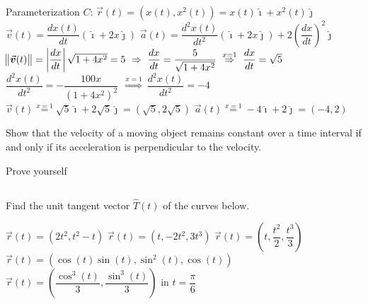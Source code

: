 \begin{Answer}
   
        \Question Parameterization $C$: $\vec r(t)  = \left( x(t), x^2(t) \right) = x(t)  \hat{\imath} + x^2(t) \hat{\jmath} $ 
        \Question $\vec v (t) = \dfrac{d x (t)}{dt} \left( \hat{\imath} + 2x \hat{\jmath} \right)$
        \Question $\vec a (t) = \dfrac{d^2 x(t)}{dt^2} \left( \hat{\imath} + 2x \hat{\jmath}\right) + 2 \left( \dfrac{dx}{dt}\right)^2 \hat{\jmath} $
        \Question $\norm{\vec v (t)} = \left\vert \dfrac{dx}{dt} \right\vert \sqrt{1+4x^2}  = 5 \  \Rightarrow \  \dfrac{dx}{dt} = \dfrac{5}{\sqrt{1+4x^2}}\  \stackrel{x=1}{\Rightarrow} \  \dfrac{dx}{dt}  = \sqrt{5} $
        \Question  $\dfrac{d^2 x(t)}{dt^2} = - \dfrac{100 x}{(1+4x^2)^2}\ \  \stackrel{x=1}{\Rightarrow} \  \dfrac{d^2 x(t)}{dt^2} = -4 $
        \Question $\vec v (t)\stackrel{x=1}{=} \sqrt{5} \hat{\imath}+ 2 \sqrt{5} \hat{\jmath} = \left( \sqrt{5}, 2 \sqrt{5}\right)$
         \Question $\vec a (t)\stackrel{x=1}{=} -4 \hat{\imath}+ 2 \hat{\jmath}= \left( -4, 2\right)$

\end{Answer}


\ifanalysis
\begin{Exercise}[difficulty = 3] Show that the velocity of a moving object remains constant over a time interval if and only if its acceleration is perpendicular to the velocity.  

\end{Exercise}

\begin{Answer}
    Prove yourself
\end{Answer}

\fi
  

\ifcalculus\pagebreak\fi
\subsection*{}     
\begin{Exercise} Find the unit tangent vector $\widehat T(t)$ of the curves below.
     \begin{multicols}{2}
         \Question[difficulty=1] $\vec r(t) = \left(2t^2, t^2-t \right) $ 
         \Question[difficulty=1] $\vec r(t) = \left(t, -2t^2, 3t^3 \right)$ 
         \Question[difficulty=1] $\vec r(t) = \left(t, \dfrac{t^2}{2}, \dfrac{t^3}{3} \right)$ 
         \Question[difficulty=2] $\vec r(t) = \left(\cos(t) \sin (t), \sin^2 (t), \cos(t)\right)$
         \ifanalysis\Question[difficulty=2]\fi\ifcalculus\Question[difficulty=3]\fi  $\vec r(t) = \left(\dfrac{\cos^3(t)}{3}, \dfrac{\sin^3(t)}{3}\right)$ \quad in \; $t=\dfrac{\pi}{6}$
        \EndCurrentQuestion
     \end{multicols}
\end{Exercise}

